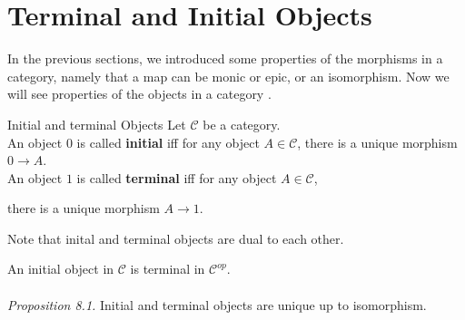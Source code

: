 \newpage 

\section {Terminal and Initial Objects}
In the previous sections, we introduced some properties of the morphisms in a category, namely that a map can be monic or epic, or an isomorphism. Now we will see properties of the objects in a category .
\begin {definition}{Initial and terminal Objects}
  Let $\mathscr{C}$ be a category.\\

  An object $0$ is called \textbf{initial}  iff for any object $A \in \mathscr{C}$,
  there is a unique morphism $0 \to A$.\\
  An object $1$ is called \textbf{terminal} iff for any object $A \in \mathscr{C}$,

  there is a unique morphism $A \to 1$.
\end {definition}

Note that inital and terminal objects are dual to each other.


An initial object in $\mathscr{C}$ is terminal in $\mathscr{C}^{op}$.\\
\\\textit{Proposition 8.1.}
Initial and terminal objects are unique up to isomorphism.

